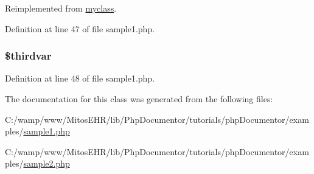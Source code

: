 \-Reimplemented from \hyperlink{classmyclass_a380d4f7424ae53505c6ce9bf5a39dffd}{myclass}.



\-Definition at line 47 of file sample1.\-php.

\hypertarget{classbabyclass_a472dcb5af91e6053c5ad74fd2a01c2fb}{
\subsubsection[{\$thirdvar}]{\setlength{\rightskip}{0pt plus 5cm}\$thirdvar}}\label{classbabyclass_a472dcb5af91e6053c5ad74fd2a01c2fb}


\-Definition at line 48 of file sample1.\-php.



\-The documentation for this class was generated from the following files\-:\begin{DoxyCompactItemize}
\item 
\-C\-:/wamp/www/\-Mitos\-E\-H\-R/lib/\-Php\-Documentor/tutorials/php\-Documentor/examples/\hyperlink{sample1_8php}{sample1.\-php}\item 
\-C\-:/wamp/www/\-Mitos\-E\-H\-R/lib/\-Php\-Documentor/tutorials/php\-Documentor/examples/\hyperlink{sample2_8php}{sample2.\-php}\end{DoxyCompactItemize}
